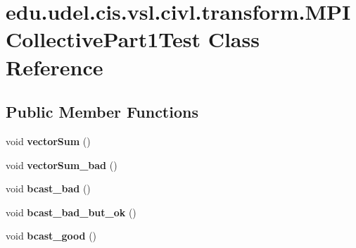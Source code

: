\hypertarget{classedu_1_1udel_1_1cis_1_1vsl_1_1civl_1_1transform_1_1MPICollectivePart1Test}{}\section{edu.\+udel.\+cis.\+vsl.\+civl.\+transform.\+M\+P\+I\+Collective\+Part1\+Test Class Reference}
\label{classedu_1_1udel_1_1cis_1_1vsl_1_1civl_1_1transform_1_1MPICollectivePart1Test}
\subsection*{Public Member Functions}
\begin{DoxyCompactItemize}
\item 
\hypertarget{classedu_1_1udel_1_1cis_1_1vsl_1_1civl_1_1transform_1_1MPICollectivePart1Test_a379bc89ff1539ce1a6946762ad4b8ea9}{}void {\bfseries vector\+Sum} ()\label{classedu_1_1udel_1_1cis_1_1vsl_1_1civl_1_1transform_1_1MPICollectivePart1Test_a379bc89ff1539ce1a6946762ad4b8ea9}

\item 
\hypertarget{classedu_1_1udel_1_1cis_1_1vsl_1_1civl_1_1transform_1_1MPICollectivePart1Test_af3539171d7e4c0e69110b1905c62ab70}{}void {\bfseries vector\+Sum\+\_\+bad} ()\label{classedu_1_1udel_1_1cis_1_1vsl_1_1civl_1_1transform_1_1MPICollectivePart1Test_af3539171d7e4c0e69110b1905c62ab70}

\item 
\hypertarget{classedu_1_1udel_1_1cis_1_1vsl_1_1civl_1_1transform_1_1MPICollectivePart1Test_ac760cc47347d0cd4b215b5535cce4195}{}void {\bfseries bcast\+\_\+bad} ()\label{classedu_1_1udel_1_1cis_1_1vsl_1_1civl_1_1transform_1_1MPICollectivePart1Test_ac760cc47347d0cd4b215b5535cce4195}

\item 
\hypertarget{classedu_1_1udel_1_1cis_1_1vsl_1_1civl_1_1transform_1_1MPICollectivePart1Test_a7e8bf2e5ed59fce2823dad38e0241aab}{}void {\bfseries bcast\+\_\+bad\+\_\+but\+\_\+ok} ()\label{classedu_1_1udel_1_1cis_1_1vsl_1_1civl_1_1transform_1_1MPICollectivePart1Test_a7e8bf2e5ed59fce2823dad38e0241aab}

\item 
\hypertarget{classedu_1_1udel_1_1cis_1_1vsl_1_1civl_1_1transform_1_1MPICollectivePart1Test_a68c64b8659307ce2c496c40d36124c0b}{}void {\bfseries bcast\+\_\+good} ()\label{classedu_1_1udel_1_1cis_1_1vsl_1_1civl_1_1transform_1_1MPICollectivePart1Test_a68c64b8659307ce2c496c40d36124c0b}


\end{DoxyCompactItemize}
